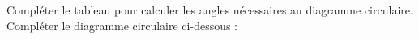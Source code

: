 \documentclass[../Cours.tex]{subfiles}
\begin{document}
\begin{questions}
    \question Compléter le tableau pour calculer les angles nécessaires au diagramme circulaire.
    \question Compléter le diagramme circulaire ci-dessous : 
    \begin{center}
    \end{center}
\end{questions}
\end{document}
